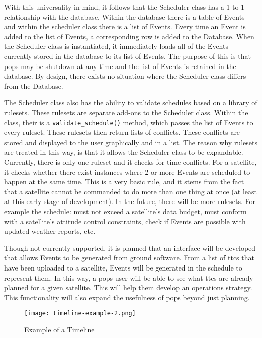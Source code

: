 With this universality in mind, it follows that the Scheduler class has a
1-to-1 relationship with the database. Within the database there is a table of
Events and within the scheduler class there is a list of Events. Every time an
Event is added to the list of Events, a corresponding row is added to the
Database. When the Scheduler class is instantiated, it immediately loads all of
the Events currently stored in the database to its list of Events. The purpose
of this is that \gls{pops} may be shutdown at any time and the list of Events
is retained in the database. By design, there exists no situation where the
Scheduler class differs from the Database.

The Scheduler class also has the ability to validate schedules based on a
library of rulesets. These rulesets are separate add-ons to the Scheduler
class. Within the class, their is a \texttt{validate\_schedule()} method, which
passes the list of Events to every ruleset. These rulesets then return lists of
conflicts. These conflicts are stored and displayed to the user graphically and
in a list. The reason why rulesets are treated in this way, is that it allows
the Scheduler class to be expandable. Currently, there is only one ruleset and
it checks for time conflicts. For a satellite, it checks whether there exist
instances where 2 or more Events are scheduled to happen at the same time.
This is a very basic rule, and it stems from the fact that a satellite cannot
be commanded to do more than one thing at once (at least at this early stage of
development).  In the future, there will be more rulesets.  For example the
schedule: must not exceed a satellite's data budget, must conform with a
satellite's attitude control constraints, check if Events are possible with
updated weather reports, etc.

Though not currently supported, it is planned that an interface will be
developed that allows Events to be generated from ground software. From a list
of \glspl{ttc} that have been uploaded to a satellite, Events will be generated
in the schedule to represent them. In this way, a \gls{pops} user will be able
to see what \glspl{ttc} are already planned for a given satellite. This will
help them develop an operations strategy. This functionality will also expand
the usefulness of \gls{pops} beyond just planning.

\begin{figure}
    \centering
    \texttt{[image: timeline-example-2.png]} 
    \caption{Example of a Timeline}
    \label{fig:scheduler-timeline}
\end{figure}

